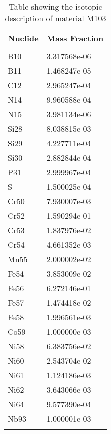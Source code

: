 \begin{centering}
\begin{longtable}[ht!]
{ p{} | p{} }
\hline
Nuclide & Mass Fraction\\
\hline
\\
B10 & 3.317568e-06\\
B11 & 1.468247e-05\\
C12 & 2.965247e-04\\
N14 & 9.960588e-04\\
N15 & 3.981134e-06\\
Si28 & 8.038815e-03\\
Si29 & 4.227711e-04\\
Si30 & 2.882844e-04\\
P31 & 2.999967e-04\\
S & 1.500025e-04\\
Cr50 & 7.930007e-03\\
Cr52 & 1.590294e-01\\
Cr53 & 1.837976e-02\\
Cr54 & 4.661352e-03\\
Mn55 & 2.000002e-02\\
Fe54 & 3.853009e-02\\
Fe56 & 6.272146e-01\\
Fe57 & 1.474418e-02\\
Fe58 & 1.996561e-03\\
Co59 & 1.000000e-03\\
Ni58 & 6.383756e-02\\
Ni60 & 2.543704e-02\\
Ni61 & 1.124186e-03\\
Ni62 & 3.643066e-03\\
Ni64 & 9.577390e-04\\
Nb93 & 1.000001e-03\\

\caption{Table showing the isotopic description of material M103}
\label{table:material_M103}
\end{longtable}\clearpage


\end{centering}
